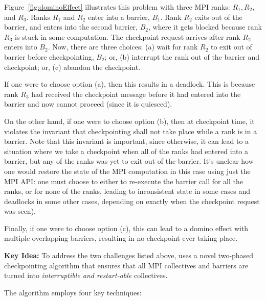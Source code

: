 \documentclass[11pt,letter]{article}
\begin{document}
Figure~\ref{fig:dominoEffect} illustrates this problem with three MPI ranks:
$R_1, R_2,$ and $R_3$. Ranks $R_1$ and $R_2$ enter into a barrier, $B_1$. Rank
$R_2$ exits out of the barrier, and enters into the second barrier, $B_2$, where
it gets blocked because rank $R_3$ is stuck in some computation. The checkpoint
request arrives after rank $R_2$ enters into $B_2$. Now, there are three
choices: (a) wait for rank $R_2$ to exit out of barrier before checkpointing,
$B_2$; or, (b) interrupt the rank out of the barrier and checkpoint; or, (c)
abandon the checkpoint.

If one were to choose option (a), then this results in a deadlock. This
is because rank $R_3$ had received the checkpoint message before it had entered
into the barrier and now cannot proceed (since it is quiesced).

On the other hand, if one were to choose option (b), then at checkpoint time,
it violates the invariant that checkpointing shall not take place while a
rank is in a barrier. Note that this invariant is important, since otherwise,
it can lead to a situation where we take a checkpoint when all of the ranks
had entered into a barrier, but any of the ranks was yet to exit out of the
barrier. It's unclear how one would restore the state of the MPI computation in
this case using just the MPI API: one must choose to either to re-execute
the barrier call for all the ranks, or for none of the ranks, leading to
inconsistent state in some cases and deadlocks in some other cases, depending
on exactly when the checkpoint request was seen).

Finally, if one were to choose option (c), this can lead to a domino effect
with multiple overlapping barriers, resulting in no checkpoint ever taking
place.

\noindent \textbf{Key Idea:} To address the two challenges listed above, \mpiSol{}
uses a novel two-phased checkpointing algorithm that ensures that all MPI
collectives and barriers are turned into {\em interruptible and restart-able}
collectives.

The algorithm employs four key techniques:
\end{document}
